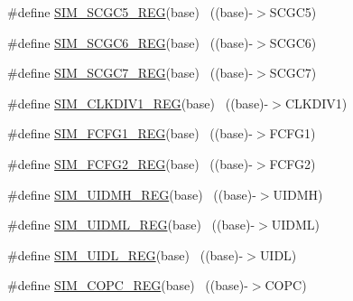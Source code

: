 \begin{DoxyCompactItemize}
\item 
\#define \hyperlink{group___s_i_m___register___accessor___macros_gaf51026d4b580eca5948ae938148192e9}{S\+I\+M\+\_\+\+S\+C\+G\+C5\+\_\+\+R\+EG}(base)                                        ~((base)-\/$>$S\+C\+G\+C5)
\item 
\#define \hyperlink{group___s_i_m___register___accessor___macros_ga0d700471b59fa17a37db41eea9ac34d4}{S\+I\+M\+\_\+\+S\+C\+G\+C6\+\_\+\+R\+EG}(base)                                        ~((base)-\/$>$S\+C\+G\+C6)
\item 
\#define \hyperlink{group___s_i_m___register___accessor___macros_ga8524b7aa144aa516fbbc9ac2da38c7b0}{S\+I\+M\+\_\+\+S\+C\+G\+C7\+\_\+\+R\+EG}(base)                                        ~((base)-\/$>$S\+C\+G\+C7)
\item 
\#define \hyperlink{group___s_i_m___register___accessor___macros_ga9a2e39cdabbfa7d094a5442016be4dd0}{S\+I\+M\+\_\+\+C\+L\+K\+D\+I\+V1\+\_\+\+R\+EG}(base)                                    ~((base)-\/$>$C\+L\+K\+D\+I\+V1)
\item 
\#define \hyperlink{group___s_i_m___register___accessor___macros_ga6cc80fd9f1edfd8f709d2c8fe3c97080}{S\+I\+M\+\_\+\+F\+C\+F\+G1\+\_\+\+R\+EG}(base)                                        ~((base)-\/$>$F\+C\+F\+G1)
\item 
\#define \hyperlink{group___s_i_m___register___accessor___macros_ga8e1caad19971280346dc9c767c8f4b6e}{S\+I\+M\+\_\+\+F\+C\+F\+G2\+\_\+\+R\+EG}(base)                                        ~((base)-\/$>$F\+C\+F\+G2)
\item 
\#define \hyperlink{group___s_i_m___register___accessor___macros_gaffd69cc3f48c0e204d8c659424b4c51d}{S\+I\+M\+\_\+\+U\+I\+D\+M\+H\+\_\+\+R\+EG}(base)                                        ~((base)-\/$>$U\+I\+D\+MH)
\item 
\#define \hyperlink{group___s_i_m___register___accessor___macros_gaac80320f7e56ccd1cd6b54cfdc322430}{S\+I\+M\+\_\+\+U\+I\+D\+M\+L\+\_\+\+R\+EG}(base)                                        ~((base)-\/$>$U\+I\+D\+ML)
\item 
\#define \hyperlink{group___s_i_m___register___accessor___macros_ga50225b2615456e0a763efbe4ec59b077}{S\+I\+M\+\_\+\+U\+I\+D\+L\+\_\+\+R\+EG}(base)                                          ~((base)-\/$>$U\+I\+DL)
\item 
\#define \hyperlink{group___s_i_m___register___accessor___macros_gab3c5aa73f8b7dba19392b28a0382dd23}{S\+I\+M\+\_\+\+C\+O\+P\+C\+\_\+\+R\+EG}(base)                                          ~((base)-\/$>$C\+O\+PC)

\end{DoxyCompactItemize}

